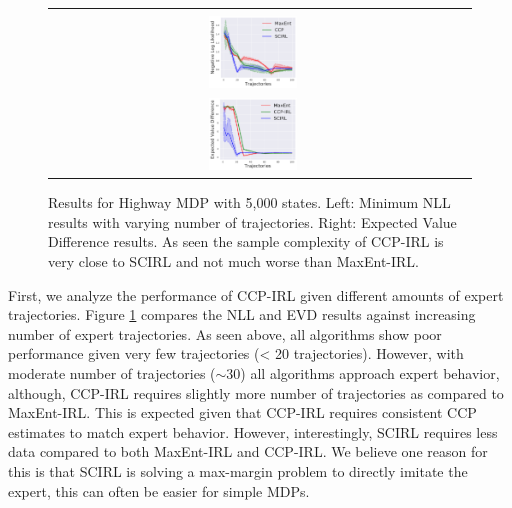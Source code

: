 \documentclass{article}
\def\MSHangBox#1{%
\begin{minipage}[t]{\textwidth}%
\begin{tabbing} %
~\\[-\baselineskip] %
#1 %
\end{tabbing}%
\end{minipage}} %
\begin{document}
\begin{figure}[t]
\centering
  \begin{tabular}{cc}
    \MSHangBox{\includegraphics[width=0.22\textwidth]{images/highway/medium_mdp/test_nll.pdf}}&
    \MSHangBox{\includegraphics[width=0.22\textwidth]{images/highway/medium_mdp/test_evd.pdf}}
    \end{tabular}
    \caption{Results for Highway MDP with 5,000 states. Left: Minimum NLL results with varying number of trajectories. Right: Expected Value Difference results. As seen the sample complexity of CCP-IRL is very close to SCIRL and not much worse than MaxEnt-IRL.}
    \label{fig:img_maxent_vs_ccp_gridworld_macro_cell}
\end{figure}

First, we analyze the performance of CCP-IRL given different amounts of expert trajectories.
Figure \ref{fig:img_maxent_vs_ccp_gridworld_macro_cell} compares the NLL and EVD results against increasing number of expert trajectories.
As seen above, all algorithms show poor performance given very few trajectories (< 20 trajectories).
However, with moderate number of trajectories ($\sim$30) all algorithms approach expert behavior, although, CCP-IRL requires slightly more number of trajectories as compared to MaxEnt-IRL. This is expected given that CCP-IRL requires consistent CCP estimates to match expert behavior. However, interestingly, SCIRL requires less data compared to both MaxEnt-IRL and CCP-IRL. We believe one reason for this is that SCIRL is solving a max-margin problem to directly imitate the expert, this can often be easier for simple MDPs. 
\end{document}
